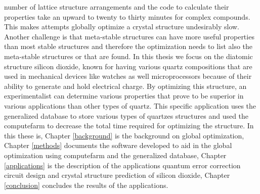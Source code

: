 number of lattice structure arrangements and the code to calculate their properties take an upward to twenty to thirty minutes for complex compounds. This makes attempts globally optimize a crystal structure undesirably slow. Another challenge is that meta-stable structures can have more useful properties than most stable structures and therefore the optimization needs to list also the meta-stable structures or that are found. In this thesis we focus on the diatomic structure silicon
dioxide, known for having various quartz compositions that are used in mechanical devices like watches as well microprocessors because of their ability to generate and hold electrical charge. By optimizing this structure, an experimentalist can determine various properties that prove to be superior in various applications than other types of quartz. This specific application uses the generalized database to store various types of quartzes structures and used the computefarm to
decrease the total time required for optimizing the structure.
In this these is, Chapter \ref{background} is the background on global optimization, Chapter \ref{methods} documents the software developed to aid in the global optimization using computefarm and the generalized database, Chapter \ref{applications} is the description of the applications quantum error correction circuit design and crystal structure prediction of silicon dioxide, Chapter \ref{conclusion} concludes the results of the applications.
